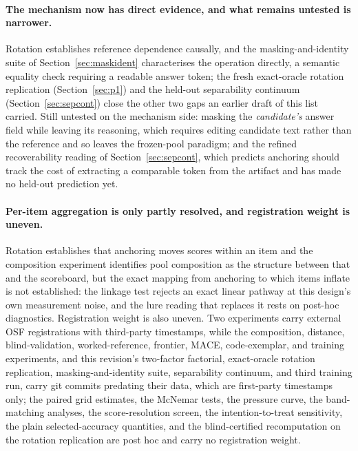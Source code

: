 \documentclass[11pt]{article}
\begin{document}
\paragraph{The mechanism now has direct evidence, and what remains untested is narrower.}
Rotation establishes reference dependence causally, and the masking-and-identity suite of Section~\ref{sec:maskident} characterises the operation directly, a semantic equality check requiring a readable answer token; the fresh exact-oracle rotation replication (Section~\ref{sec:p1}) and the held-out separability continuum (Section~\ref{sec:sepcont}) close the other two gaps an earlier draft of this list carried.
Still untested on the mechanism side: masking the \emph{candidate's} answer field while leaving its reasoning, which requires editing candidate text rather than the reference and so leaves the frozen-pool paradigm; and the refined recoverability reading of Section~\ref{sec:sepcont}, which predicts anchoring should track the cost of extracting a comparable token from the artifact and has made no held-out prediction yet.

\paragraph{Per-item aggregation is only partly resolved, and registration weight is uneven.}
Rotation establishes that anchoring moves scores within an item and the composition experiment identifies pool composition as the structure between that and the scoreboard, but the exact mapping from anchoring to which items inflate is not established: the linkage test rejects an exact linear pathway at this design's own measurement noise, and the lure reading that replaces it rests on post-hoc diagnostics.
Registration weight is also uneven. Two experiments carry external OSF registrations with third-party timestamps, while the composition, distance, blind-validation, worked-reference, frontier, \textsc{MACE}, code-exemplar, and training experiments, and this revision's two-factor factorial, exact-oracle rotation replication, masking-and-identity suite, separability continuum, and third training run, carry git commits predating their data, which are first-party timestamps only; the paired grid estimates, the McNemar tests, the pressure curve, the band-matching analyses, the score-resolution screen, the intention-to-treat sensitivity, the plain selected-accuracy quantities, and the blind-certified recomputation on the rotation replication are post hoc and carry no registration weight.
\end{document}
